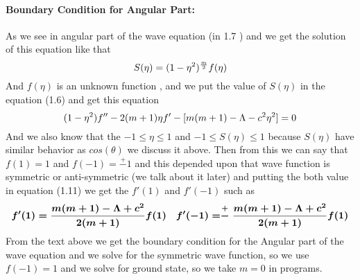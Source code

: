 \documentclass[12pt]{report}
\begin{document}
	    \paragraph{Boundary Condition for Angular Part:} 
			\normalsize As we see in angular part of the wave equation (in 1.7 ) and we get the solution of this equation like that \\
			\begin{equation}
				\normalsize \boldmath
				S(\eta) = (1-{\eta}^{2})^{\frac{m}{2}}f(\eta)
			\end{equation}
			\normalsize And $f(\eta)$ is an unknown function , and we put the value of $S(\eta) $ in the equation (1.6) and get this equation \\
			\begin{equation}
				\normalsize \boldmath
				(1-{\eta}^2)f'' - 2(m+1)\eta f' - [m(m+1)-\Lambda-c^{2}{\eta}^2] = 0 
			\end{equation}
			\normalsize \boldmath And we also know that the $-1 ≤ \eta ≤ 1$ and $ -1 ≤ S(\eta) ≤ 1$ because $S(\eta)$ have similar behavior as $cos(\theta) $ we discuss it above. Then from this we can say that $f(1)=1$ and $f(-1)=\stackrel{+}{-}1$ and this depended upon that wave function is symmetric or anti-symmetric (we talk about it  later) and putting the both value in equation (1.11) we get the $f'(1)$ and $f'(-1)$ such as 
			\begin{equation}
				\normalsize \boldmath
				\begin{aligned}
					&	f'(1) = \frac{m(m+1) - \Lambda + c^2 }{2(m+1)} f(1)
					&   f'(-1) = \stackrel{+}{-}\frac{m(m+1) - \Lambda + c^2 }{2(m+1)} f(1)
				\end{aligned}
			\end{equation}
			\normalsize From the text above we get the boundary condition for the Angular part of the wave equation and we solve for the symmetric wave function, so we use \boldmath $f(-1) = 1$ and we solve for ground state, so we take $m=0$ in programs.\\
\end{document}
